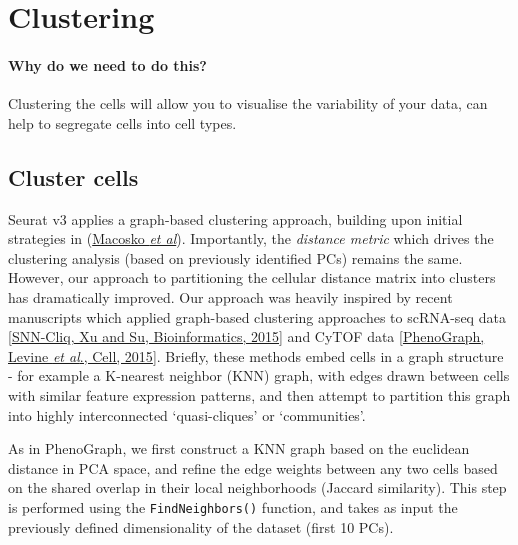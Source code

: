 \documentclass[
]{book}
\begin{document}
\chapter{Clustering}\label{clustering}

\subsubsection*{Why do we need to do this?}\label{why-do-we-need-to-do-this-5}

Clustering the cells will allow you to visualise the variability of your data, can help to segregate cells into cell types.

\subsubsection*{}\label{section-8}

\section{Cluster cells}\label{cluster-cells}

Seurat v3 applies a graph-based clustering approach, building upon initial strategies in (\href{http://www.cell.com/abstract/S0092-8674(15)00549-8}{Macosko \emph{et al}}). Importantly, the \emph{distance metric} which drives the clustering analysis (based on previously identified PCs) remains the same. However, our approach to partitioning the cellular distance matrix into clusters has dramatically improved. Our approach was heavily inspired by recent manuscripts which applied graph-based clustering approaches to scRNA-seq data \href{http://bioinformatics.oxfordjournals.org/content/early/2015/02/10/bioinformatics.btv088.abstract}{{[}SNN-Cliq, Xu and Su, Bioinformatics, 2015{]}} and CyTOF data \href{http://www.ncbi.nlm.nih.gov/pubmed/26095251}{{[}PhenoGraph, Levine \emph{et al}., Cell, 2015{]}}. Briefly, these methods embed cells in a graph structure - for example a K-nearest neighbor (KNN) graph, with edges drawn between cells with similar feature expression patterns, and then attempt to partition this graph into highly interconnected `quasi-cliques' or `communities'.

As in PhenoGraph, we first construct a KNN graph based on the euclidean distance in PCA space, and refine the edge weights between any two cells based on the shared overlap in their local neighborhoods (Jaccard similarity). This step is performed using the \texttt{FindNeighbors()} function, and takes as input the previously defined dimensionality of the dataset (first 10 PCs).
\end{document}
